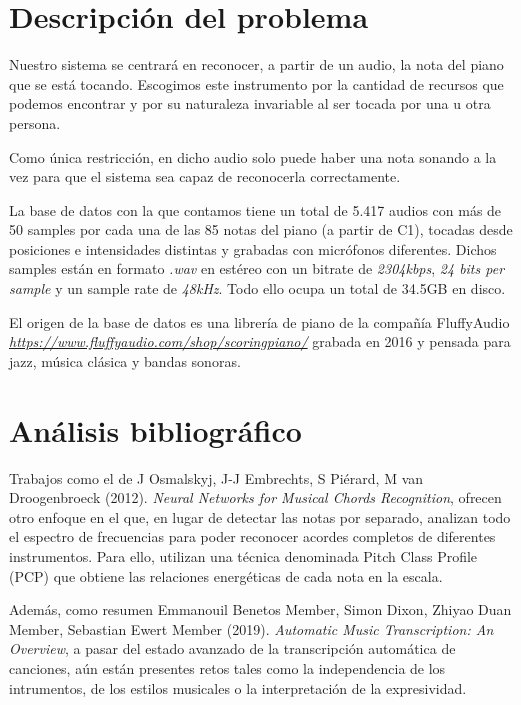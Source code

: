 \documentclass[12pt]{article}
\begin{document}
\newpage

\section{Descripción del problema}
\label{Descripción del problema}

Nuestro sistema se centrará en reconocer, a partir de un audio, la nota del piano que se está tocando. Escogimos este instrumento por la cantidad de recursos
que podemos encontrar y por su naturaleza invariable al ser tocada por una u otra persona.

\bigskip
Como única restricción, en dicho audio solo puede haber una nota sonando a la vez para que el sistema sea capaz de reconocerla correctamente.

\bigskip
La base de datos con la que contamos tiene un total de 5.417 audios con más de 50 samples por cada una de las 85 notas del piano (a partir de C1), tocadas
desde posiciones e intensidades distintas y grabadas con micrófonos diferentes. Dichos samples están en formato \textit{.wav} en estéreo con un 
bitrate de \textit{2304kbps}, \textit{24 bits per sample} y un sample rate de \textit{48kHz}. Todo ello ocupa un total de 34.5GB en disco.

\bigskip
El origen de la base de datos es una librería de piano de la compañía FluffyAudio \textit{\url{https://www.fluffyaudio.com/shop/scoringpiano/}} 
grabada en 2016 y pensada para jazz, música clásica y bandas sonoras.

\section{Análisis bibliográfico}
\label{Análisis bibliográfico}

Trabajos como el de J Osmalskyj, J-J Embrechts, S Piérard, M van Droogenbroeck (2012). \textit{Neural Networks for Musical Chords Recognition}, ofrecen otro enfoque
en el que, en lugar de detectar las notas por separado, analizan todo el espectro de frecuencias para poder reconocer acordes completos de diferentes instrumentos.
Para ello, utilizan una técnica denominada Pitch Class Profile (PCP) que obtiene las relaciones energéticas de cada nota en la escala.

\bigskip
Además, como resumen Emmanouil Benetos Member, Simon Dixon, Zhiyao Duan Member, Sebastian Ewert Member (2019). \textit{Automatic Music Transcription: An Overview},
a pasar del estado avanzado de la transcripción automática de canciones, aún están presentes retos tales como la independencia de los intrumentos, de los estilos
musicales o la interpretación de la expresividad.
\end{document}
